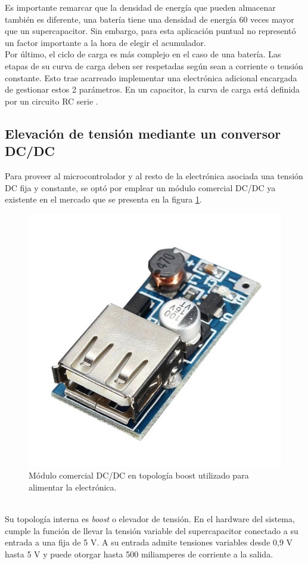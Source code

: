 Es importante remarcar que la densidad de energía que pueden almacenar también es diferente, una batería tiene una densidad de energía 60 veces mayor que un supercapacitor. Sin embargo, para esta aplicación puntual no representó un factor importante a la hora de elegir el acumulador.\\
Por último, el ciclo de carga es más complejo en el caso de una batería. Las etapas de su curva de carga deben ser respetadas según sean a corriente o tensión constante. Esto trae acarreado implementar una electrónica adicional encargada de gestionar estos 2 parámetros. En un capacitor, la curva de carga está definida por un circuito RC serie \citep{ceraolo2014fundamentals}.\\ 

\subsection{Elevación de tensión mediante un conversor DC/DC }
Para proveer al microcontrolador y al resto de la electrónica asociada una tensión DC fija y constante, se optó por emplear un módulo comercial DC/DC ya existente en el mercado que se presenta en la figura \ref{fig:dcdcboost}.\\
\begin{figure}[h!]
	\centering
	\includegraphics[width=0.4\linewidth]{Figures/dcdc_boost}
	\caption{Módulo comercial DC/DC en topología boost utilizado para alimentar la electrónica.}
	\label{fig:dcdcboost}
\end{figure}\\
Su topología interna es \textit{boost} o elevador de tensión. En el hardware del sistema, cumple la función de llevar la tensión variable del supercapacitor conectado a su entrada a una fija de 5 V. 
A su entrada admite tensiones variables desde 0,9 V hasta 5 V y puede otorgar hasta 500 miliamperes de corriente a la salida.

